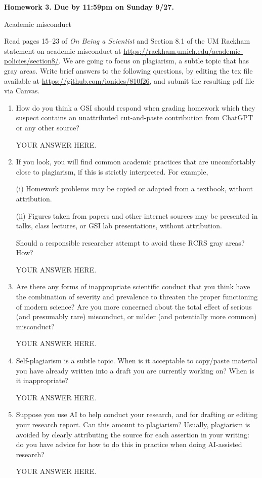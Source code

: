 \documentclass[12pt]{article}
\begin{document}
\begin{center}\bf
Homework 3. Due by 11:59pm on Sunday 9/27.

Academic misconduct

\end{center}
Read pages 15--23 of {\em On Being a Scientist} and Section 8.1 of the UM Rackham statement on academic misconduct at \url{https://rackham.umich.edu/academic-policies/section8/}. We are going to focus on plagiarism, a subtle topic that has gray areas. Write brief answers to the following questions, by editing the tex file available at \url{https://github.com/ionides/810f26}, and submit the resulting pdf file via Canvas. 

\begin{enumerate}

\item How do you think a GSI should respond when grading homework which they suspect contains an unattributed cut-and-paste contribution from ChatGPT or any other source?

YOUR ANSWER HERE.

\item If you look, you will find common academic practices that are uncomfortably close to plagiarism, if this is strictly interpreted. For example,

(i) Homework problems may be copied or adapted from a textbook, without attribution.

(ii) Figures taken from papers and other internet sources may be presented in talks, class lectures, or GSI lab presentations, without attribution.

Should a responsible researcher attempt to avoid these RCRS gray areas? How?
  
YOUR ANSWER HERE.

\item Are there any forms of inappropriate scientific conduct that you think have the combination of severity and prevalence to threaten the proper functioning of modern science? Are you more concerned about the total effect of serious (and presumably rare) misconduct, or milder (and potentially more common) misconduct?

YOUR ANSWER HERE.

\item Self-plagiarism is a subtle topic. When is it acceptable to copy/paste material you have already written into a draft you are currently working on? When is it inappropriate?

YOUR ANSWER HERE.

\item Suppose you use AI to help conduct your research, and for drafting or editing your research report. Can this amount to plagiarism? Usually, plagiarism is avoided by clearly attributing the source for each assertion in your writing: do you have advice for how to do this in practice when doing AI-assisted research?

YOUR ANSWER HERE.

\end{enumerate}
\end{document}
